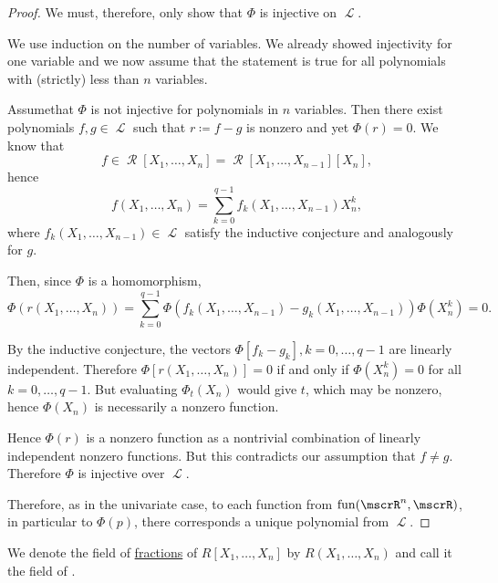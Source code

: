 \begin{proof}
  We must, therefore, only show that \( \Phi \) is injective on \( \mscrL \).

  We use induction on the number of variables. We already showed injectivity for one variable and we now assume that the statement is true for all polynomials with (strictly) less than \( n \) variables.

  Assume\LEM that \( \Phi \) is not injective for polynomials in \( n \) variables. Then there exist polynomials \( f, g \in \mscrL \) such that \( r \coloneqq f - g \) is nonzero and yet \( \Phi(r) = 0 \). We know that
  \begin{equation*}
    f \in \mscrR[X_1, \ldots, X_n] = \mscrR[X_1, \ldots, X_{n-1}][X_n],
  \end{equation*}
  hence
  \begin{equation*}
    f(X_1, \ldots, X_n) = \sum_{k=0}^{q-1} f_k(X_1, \ldots, X_{n-1}) X_n^k,
  \end{equation*}
  where \( f_k(X_1, \ldots, X_{n-1}) \in \mscrL \) satisfy the inductive conjecture and analogously for \( g \).

  Then, since \( \Phi \) is a homomorphism,
  \begin{equation*}
    \Phi(r(X_1, \ldots, X_n)) = \sum_{k=0}^{q-1} \Phi(f_k(X_1, \ldots, X_{n-1}) - g_k(X_1, \ldots, X_{n-1})) \Phi(X_n^k) = 0.
  \end{equation*}

  By the inductive conjecture, the vectors \( \Phi[f_k - g_k], k = 0, \ldots, q - 1 \) are linearly independent. Therefore \( \Phi[r(X_1, \ldots, X_n)] = 0 \) if and only if \( \Phi(X_n^k) = 0 \) for all \( k = 0, \ldots, q - 1 \). But evaluating \( \Phi_t(X_n) \) would give \( t \), which may be nonzero, hence \( \Phi(X_n) \) is necessarily a nonzero function.

  Hence \( \Phi(r) \) is a nonzero function as a nontrivial combination of linearly independent nonzero functions. But this contradicts our assumption that \( f \neq g \). Therefore \( \Phi \) is injective over \( \mscrL \).

  Therefore, as in the univariate case, to each function from \( \fun(\mscrR^n, \mscrR) \), in particular to \( \Phi(p) \), there corresponds a unique polynomial from \( \mscrL \).
\end{proof}

\begin{definition}\label{def:rational_algebraic_function}
  We denote the field of \hyperref[def:field_of_fractions]{fractions} of \( R[X_1, \ldots, X_n] \) by \( R(X_1, \ldots, X_n) \) and call it the field of .
\end{definition}

